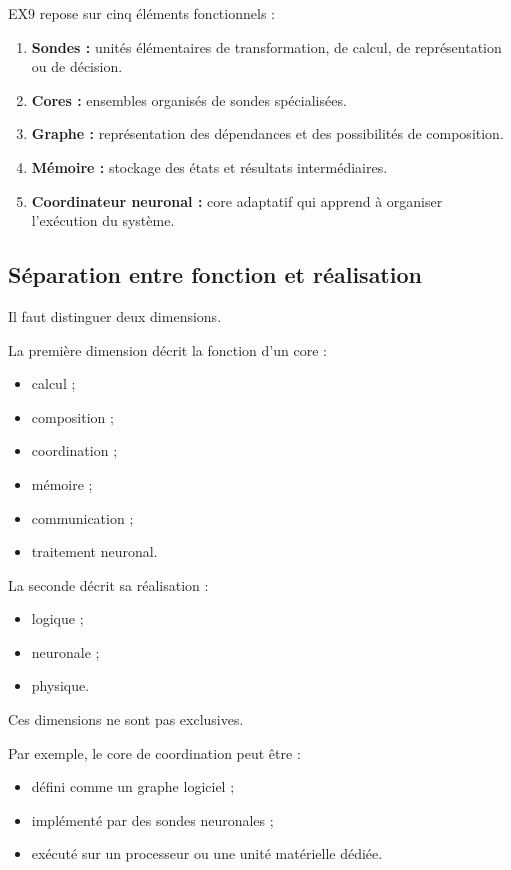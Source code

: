 \documentclass[11pt,a4paper]{article}
\begin{document}
EX9 repose sur cinq éléments fonctionnels :

\begin{enumerate}
  \item \textbf{Sondes :} unités élémentaires de transformation,
        de calcul, de représentation ou de décision.
  \item \textbf{Cores :} ensembles organisés de sondes spécialisées.
  \item \textbf{Graphe :} représentation des dépendances et des
        possibilités de composition.
  \item \textbf{Mémoire :} stockage des états et résultats intermédiaires.
  \item \textbf{Coordinateur neuronal :} core adaptatif qui apprend
        à organiser l'exécution du système.
\end{enumerate}

\subsection{Séparation entre fonction et réalisation}

Il faut distinguer deux dimensions.

La première dimension décrit la fonction d'un core :
\begin{itemize}
  \item calcul ;
  \item composition ;
  \item coordination ;
  \item mémoire ;
  \item communication ;
  \item traitement neuronal.
\end{itemize}

La seconde décrit sa réalisation :
\begin{itemize}
  \item logique ;
  \item neuronale ;
  \item physique.
\end{itemize}

Ces dimensions ne sont pas exclusives.

Par exemple, le core de coordination peut être :
\begin{itemize}
  \item défini comme un graphe logiciel ;
  \item implémenté par des sondes neuronales ;
  \item exécuté sur un processeur ou une unité matérielle dédiée.
\end{itemize}
\end{document}
